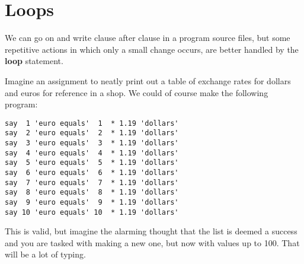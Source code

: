 {\section{Loops}
We can go on and write clause after clause in a program source files,
but some repetitive actions in which only a small change occurs, are
better handled by the \textbf{loop} statement.




Imagine an assignment to neatly print out a table of exchange rates for
dollars and euros for reference in a shop. We could of course make the
following program:
\begin{lstlisting}[label=withoutloop,caption=Without a loop]
say  1 'euro equals'  1  * 1.19 'dollars'
say  2 'euro equals'  2  * 1.19 'dollars'
say  3 'euro equals'  3  * 1.19 'dollars'
say  4 'euro equals'  4  * 1.19 'dollars'
say  5 'euro equals'  5  * 1.19 'dollars'
say  6 'euro equals'  6  * 1.19 'dollars'
say  7 'euro equals'  7  * 1.19 'dollars'
say  8 'euro equals'  8  * 1.19 'dollars'
say  9 'euro equals'  9  * 1.19 'dollars'
say 10 'euro equals' 10  * 1.19 'dollars'
\end{lstlisting}
This is valid, but imagine the alarming thought that the list is deemed
a success and you are tasked with making a new one, but now with
values up to 100. That will be a lot of typing.

}
